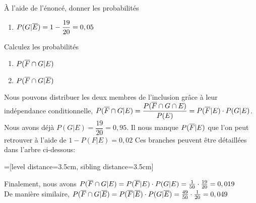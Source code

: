 \begin{exo}
\begin{subexo}{À l’aide de l’énoncé, donner les probabilités}
\begin{enumerate}
    \item	$P(G|\overline{E}) = 1 - \dfrac{19}{20} = 0,05$
  \end{enumerate}
  \end{subexo}
  \begin{subexo}{Calculez les probabilités}
    \begin{multicols}{2}
      \begin{enumerate}
        \item $P(\overline{F}\cap G|E)$
        \item $P(\overline{F}\cap G|\overline{E})$
      \end{enumerate}
    \end{multicols}
  \begin{flushleft}
  Nous pouvons distribuer les deux membres de l'inclusion grâce à leur indépendance conditionnelle, $P(\overline{F}\cap G|E) = \dfrac{P(\overline{F}\cap G \cap E) }{P(E)} = P(\overline{F}|E) \cdot P(G|E) $. Nous avons déjà $P(G|E) = \dfrac{19}{20} = 0,95$. Il nous manque $P(\overline{F}|E)$ que l'on peut retrouver à l'aide de $1 - P(F|E) = 0,02$ Ces branches peuvent être détaillées dans l'arbre ci-dessous:
  \end{flushleft}
  \begin{center}
    =[level distance=3.5cm, sibling distance=3.5cm]
  \end{center}
  \begin{flushleft}
  Finalement, nous avons $P(\overline{F}\cap G|E) = P(\overline{F}|E) \cdot P(G|E) = \frac{1}{50} \cdot \frac{19}{20} = 0,019$\\
  De manière similaire, $P(\overline{F}\cap G|\overline{E}) = P(\overline{F}|\overline{E}) \cdot P(G|\overline{E}) = \frac{49}{50} \cdot \frac{1}{20} = 0,049$
  \end{flushleft}
  \end{subexo}
\end{exo}
